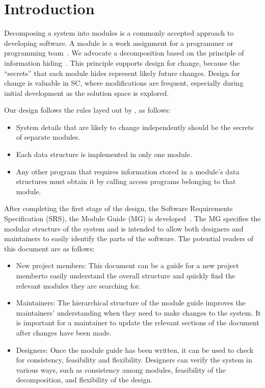 \documentclass[12pt, titlepage]{article}
\begin{document}
\newpage

\tableofcontents

\listoftables

\listoffigures

\newpage


\section{Introduction}

Decomposing a system into modules is a commonly accepted approach to developing
software.  A module is a work assignment for a programmer or programming
team~\citep{ParnasEtAl1984}.  We advocate a decomposition
based on the principle of information hiding~\citep{Parnas1972}.  This
principle supports design for change, because the ``secrets'' that each module
hides represent likely future changes.  Design for change is valuable in SC,
where modifications are frequent, especially during initial development as the
solution space is explored.  

Our design follows the rules layed out by \citet{ParnasEtAl1984}, as follows:
\begin{itemize}
\item System details that are likely to change independently should be the
  secrets of separate modules.
\item Each data structure is implemented in only one module.
\item Any other program that requires information stored in a module's data
structures must obtain it by calling access programs belonging to that
module.\end{itemize}

After completing the first stage of the design, the Software Requirements
Specification (SRS), the Module Guide (MG) is developed~\citep{ParnasEtAl1984}.
The MG
specifies the modular structure of the system and is intended to allow both
designers and maintainers to easily identify the parts of the software.  The
potential readers of this document are as follows:

\begin{itemize}
\item New project members: This document can be a guide for a new project
memberto easily understand the overall structure and quickly find the
  relevant modules they are searching for.
\item Maintainers: The hierarchical structure of the module guide improves the
maintainers' understanding when they need to make changes to the system. It is
important for a maintainer to update the relevant sections of the document
  after changes have been made.
\item Designers: Once the module guide has been written, it can be used to
  check for consistency, feasibility and flexibility. Designers can verify the
  system in various ways, such as consistency among modules, feasibility of the
  decomposition, and flexibility of the design.
\end{itemize}
\end{document}

